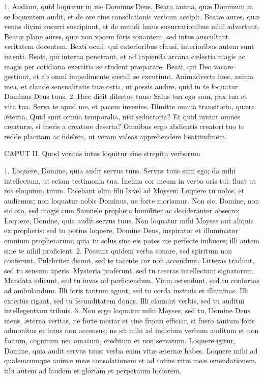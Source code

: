 1. Audiam, quid loquatur in me Dominus Deus. Beata anima, quæ Dominum in se loquentem audit, et de ore eius consolationis verbum accipit. Beatæ aures, quæ venas divini susurri suscipiunt, et de mundi huius susurrationibus nihil advertunt. Beatæ plane aures, quæ non vocem foris sonantem, sed intus auscultant veritatem docentem. Beati oculi, qui exterioribus clausi, interioribus autem sunt intenti. Beati, qui interna penetrant, et ad capienda arcana cælestia magis ac magis per cotidiana exercitia se student præparare. Beati, qui Deo vacare gestiunt, et ab omni impedimento sæculi se excutiunt. Animadverte hæc, anima mea, et claude sensualitatis tuæ ostia, ut possis audire, quid in te loquatur Dominus Deus tuus.
2. Hæc dicit dilectus tuus: Salus tua ego sum, pax tua et vita tua. Serva te apud me, et pacem invenies. Dimitte omnia transitoria, quære æterna. Quid sunt omnia temporalia, nisi seductoria? Et quid iuvant omnes creaturæ, si fueris a creatore deserta? Omnibus ergo abdicatis creatori tuo te redde placitam ac fidelem, ut veram valeas apprehendere beatitudinem.


CAPUT II.
Quod veritas intus loquitur sine strepitu verborum

1. Loquere, Domine, quia audit servus tuus. Servus tuus sum ego; da mihi intellectum, ut sciam testimonia tua. Inclina cor meum in verba oris tui: fluat ut ros eloquium tuum. Dicebant olim filii Isræl ad Moysen: Loquere tu nobis, et audiemus; non loquatur nobis Dominus, ne forte moriamur. Non sic, Domine, non sic oro, sed magis cum Samuele propheta humiliter ac desideranter obsecro: Loquere, Domine, quia audit servus tuus. Non loquatur mihi Moyses aut aliquis ex prophetis: sed tu potius loquere, Domine Deus, inspirator et illuminator omnium prophetarum; quia tu solus sine eis potes me perfecte imbuere; illi autem sine te nihil proficient.
2. Possunt quidem verba sonare, sed spiritum non conferunt. Pulchriter dicunt, sed te tacente cor non accendunt. Litteras tradunt, sed tu sensum aperis. Mysteria proferunt, sed tu reseras intellectum signatorum. Mandata edicunt, sed tu iuvas ad perficiendum. Viam ostendunt, sed tu confortas ad ambulandum. Illi foris tantum agunt, sed tu corda instruis et illuminas. Illi exterius rigant, sed tu fecunditatem donas. Illi clamant verbis, sed tu auditui intellegentiam tribuis.
3. Non ergo loquatur mihi Moyses, sed tu, Domine Deus meus, æterna veritas, ne forte moriar et sine fructu efficiar, si fuero tantum foris admonitus et intus non accensus; ne sit mihi ad iudicium verbum auditum et non factum, cognitum nec amatum, creditum et non servatum. Loquere igitur, Domine, quia audit servus tuus; verba enim vitæ æternæ habes. Loquere mihi ad qualemcumque animæ meæ consolationem et ad totius vitæ meæ emendationem, tibi autem ad laudem et gloriam et perpetuum honorem.


